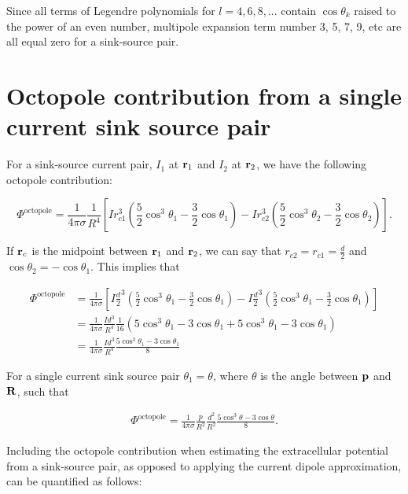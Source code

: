Since all terms of Legendre polynomials for $l = 4, 6, 8, ...$ contain $\cos \theta_k$ raised to the power of an even number, multipole expansion term number 3, 5, 7, 9, etc are all equal zero for a sink-source pair.

\section{Octopole contribution from a single current sink source pair}\label{sec:octo}

For a sink-source current pair, $I_1$ at ${\bf r}_1$ and $I_2$ at ${\bf r}_2$, we have the following octopole contribution:

\begin{equation*}
\Phi^{\mathrm{octopole}} = \frac{1}{4 \pi \sigma} \frac{1}{R^4}\left[ 
I r_{c1}^3 \left( \frac{5}{2} \cos^3 \theta_1 - 
\frac{3}{2}\cos \theta_1 \right) - 
I r_{c2}^3 \left( \frac{5}{2} \cos^3 \theta_2
 - \frac{3}{2} \cos \theta_2 \right)
\right].
\end{equation*}

If ${\bf r}_{c}$ is the midpoint between ${\bf r}_1$ and ${\bf r}_2$, we can say that $r_{c2} = r_{c1} = \frac{d}{2}$ and $\cos \theta_2 = - \cos \theta_1$. This implies that

\begin{align*}
\Phi^{\mathrm{octopole}} &= \frac{1}{4 \pi \sigma} \left[
I \frac{d}{2}^3 \left( \frac{5}{2} \cos^3 \theta_1 - 
\frac{3}{2}\cos \theta_1 \right) - 
I \frac{d}{2}^3 \left( \frac{5}{2} \cos^3 \theta_1
 - \frac{3}{2} \cos \theta_1 \right)
\right] \\
&= \frac{1}{4 \pi \sigma} \frac{I d^3}{R^4} \frac{1}{16} \left(
5 \cos^3 \theta_1 - 3 \cos \theta_1 + 5 \cos^3 \theta_1 - 3 \cos \theta_1
\right) \\
&= \frac{1}{4 \pi \sigma} \frac{I d^3}{R^4} \frac{5 \cos^3 \theta_1 - 3 \cos \theta_1}{8}
\end{align*}

For a single current sink source pair $\theta_1 = \theta$, where $\theta$ is the angle between ${\bf p}$ and ${\bf R}$, such that

\begin{align*}
\Phi^{\mathrm{octopole}} = \frac{1}{4 \pi \sigma} \frac{p}{R^2} \frac{d^2}{R^2} \frac{5 \cos^3 \theta - 3 \cos \theta}{8}.
\end{align*}

Including the octopole contribution when estimating the extracellular potential from a sink-source pair, as opposed to applying the current dipole approximation, can be quantified as follows:

